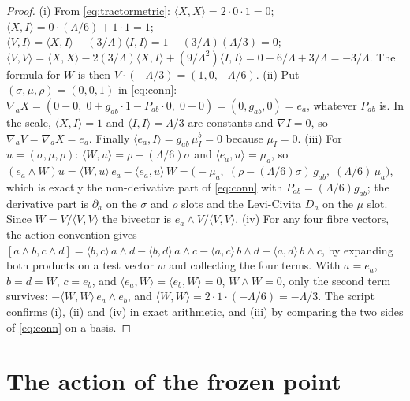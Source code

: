 \documentclass[11pt]{article}
\theoremstyle{definition}
\newcommand{\ip}[2]{\langle #1, #2\rangle}
\begin{document}
\begin{proof}
(i) From \eqref{eq:tractormetric}: $\ip{X}{X} = 2\cdot 0\cdot 1 = 0$; $\ip{X}{I} = 0\cdot(\Lambda/6) + 1\cdot 1 = 1$; $\ip{V}{I} = \ip{X}{I} - (3/\Lambda)\ip{I}{I} = 1 - (3/\Lambda)(\Lambda/3) = 0$; $\ip{V}{V} = \ip{X}{X} - 2(3/\Lambda)\ip{X}{I} + (9/\Lambda^2)\ip{I}{I} = 0 - 6/\Lambda + 3/\Lambda = -3/\Lambda$. The formula for $W$ is then $V\cdot(-\Lambda/3) = (1, 0, -\Lambda/6)$.
(ii) Put $(\sigma,\mu,\rho) = (0,0,1)$ in \eqref{eq:conn}: $\nabla_a X = (0 - 0,\; 0 + g_{ab}\cdot 1 - P_{ab}\cdot 0,\; 0 + 0) = (0, g_{ab}, 0) = e_a$, whatever $P_{ab}$ is. In the scale, $\ip{X}{I} = 1$ and $\ip{I}{I} = \Lambda/3$ are constants and $\nabla I = 0$, so $\nabla_a V = \nabla_a X = e_a$. Finally $\ip{e_a}{I} = g_{ab}\,\mu_I^b = 0$ because $\mu_I = 0$.
(iii) For $u = (\sigma,\mu,\rho)$: $\ip{W}{u} = \rho - (\Lambda/6)\sigma$ and $\ip{e_a}{u} = \mu_a$, so
$(e_a\wedge W)u = \ip{W}{u}\,e_a - \ip{e_a}{u}\,W = \bigl(-\mu_a,\; (\rho - (\Lambda/6)\sigma)\,g_{ab},\; (\Lambda/6)\,\mu_a\bigr)$,
which is exactly the non-derivative part of \eqref{eq:conn} with $P_{ab} = (\Lambda/6)g_{ab}$; the derivative part is $\partial_a$ on the $\sigma$ and $\rho$ slots and the Levi-Civita $D_a$ on the $\mu$ slot. Since $W = V/\ip{V}{V}$ the bivector is $e_a\wedge V/\ip{V}{V}$.
(iv) For any four fibre vectors, the action convention gives $[a\wedge b, c\wedge d] = \ip{b}{c}\,a\wedge d - \ip{b}{d}\,a\wedge c - \ip{a}{c}\,b\wedge d + \ip{a}{d}\,b\wedge c$, by expanding both products on a test vector $w$ and collecting the four terms. With $a = e_a$, $b = d = W$, $c = e_b$, and $\ip{e_a}{W} = \ip{e_b}{W} = 0$, $W\wedge W = 0$, only the second term survives: $-\ip{W}{W}\,e_a\wedge e_b$, and $\ip{W}{W} = 2\cdot 1\cdot(-\Lambda/6) = -\Lambda/3$. The script confirms (i), (ii) and (iv) in exact arithmetic, and (iii) by comparing the two sides of \eqref{eq:conn} on a basis.
\end{proof}

\section{The action of the frozen point}\label{sec:action}
\end{document}
